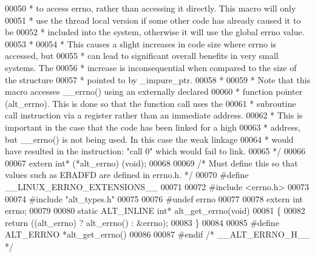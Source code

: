 \begin{DoxyCode}
00050 \textcolor{comment}{ * to access errno, rather than accessing it directly. This macro will only }
00051 \textcolor{comment}{ * use the thread local version if some other code has already caused it to be }
00052 \textcolor{comment}{ * included into the system, otherwise it will use the global errno value.}
00053 \textcolor{comment}{ *}
00054 \textcolor{comment}{ * This causes a slight increases in code size where errno is accessed, but }
00055 \textcolor{comment}{ * can lead to significant overall benefits in very small systems. The }
00056 \textcolor{comment}{ * increase is inconsequential when compared to the size of the structure}
00057 \textcolor{comment}{ * pointed to by \_impure\_ptr.}
00058 \textcolor{comment}{ *}
00059 \textcolor{comment}{ * Note that this macro accesses \_\_errno() using an externally declared }
00060 \textcolor{comment}{ * function pointer (alt\_errno). This is done so that the function call uses the}
00061 \textcolor{comment}{ * subroutine call instruction via a register rather than an immediate address.}
00062 \textcolor{comment}{ * This is important in the case that the code has been linked for a high}
00063 \textcolor{comment}{ * address, but \_\_errno() is not being used. In this case the weak linkage}
00064 \textcolor{comment}{ * would have resulted in the instruction: "call 0" which would fail to link. }
00065 \textcolor{comment}{ */}
00066 
00067 \textcolor{keyword}{extern} \textcolor{keywordtype}{int}* (*alt\_errno) (void);
00068 
00069 \textcolor{comment}{/* Must define this so that values such as EBADFD are defined in errno.h. */}
00070 \textcolor{preprocessor}{#define \_\_LINUX\_ERRNO\_EXTENSIONS\_\_}
00071 
00072 \textcolor{preprocessor}{#include <errno.h>}
00073 
00074 \textcolor{preprocessor}{#include "alt_types.h"}
00075 
00076 \textcolor{preprocessor}{#undef errno}
00077 
00078 \textcolor{keyword}{extern} \textcolor{keywordtype}{int} errno;
00079 
00080 \textcolor{keyword}{static} ALT_INLINE \textcolor{keywordtype}{int}* alt_get_errno(\textcolor{keywordtype}{void})
00081 \{
00082   \textcolor{keywordflow}{return} ((alt_errno) ? alt_errno() : &errno);
00083 \}
00084 
00085 \textcolor{preprocessor}{#define ALT\_ERRNO *alt\_get\_errno()}
00086 
00087 \textcolor{preprocessor}{#endif }\textcolor{comment}{/* \_\_ALT\_ERRNO\_H\_\_ */}\textcolor{preprocessor}{}
\end{DoxyCode}
